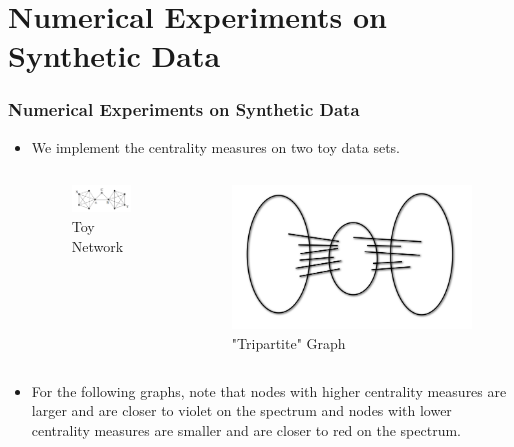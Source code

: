 \documentclass{beamer}
\begin{document}
\section{Numerical Experiments on Synthetic Data}  \label{sec:NumExpSyn}

\begin{frame}
\frametitle{Numerical Experiments on Synthetic Data}
\begin{itemize}
\item We implement the centrality measures on two toy data sets. 
\begin{columns}[T]
\begin{column}{.5\textwidth}
\begin{figure}[h]
\begin{center}
\includegraphics[width=0.76\columnwidth]{toy1.png}
\end{center}
\caption{Toy Network}
\label{fig:Toy}
\end{figure}
\end{column}
\begin{column}{.5\textwidth}
\begin{figure}[h]
\begin{center}
\includegraphics[width=0.76\columnwidth]{tripartite.png}
\end{center}
\caption{"Tripartite" Graph}
\label{fig:Toy2}
\end{figure}
\end{column}
\end{columns}
\item For the following graphs, note that nodes with higher centrality measures are larger and are closer to violet on the spectrum and nodes with lower centrality measures are smaller and are closer to red on the spectrum.
\end{itemize}
\end{frame}
\end{document}
